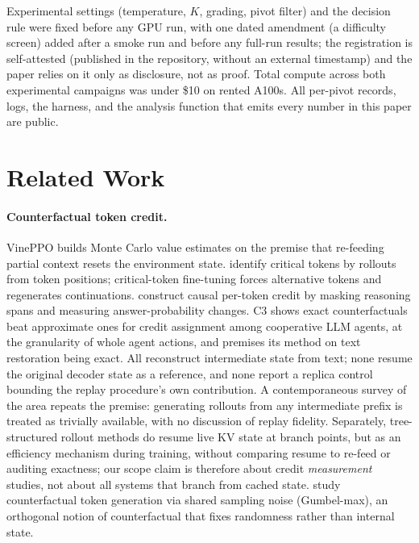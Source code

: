 \documentclass[11pt]{article}
\begin{document}
Experimental settings (temperature, $K$, grading, pivot filter) and the
decision rule were fixed before any GPU run, with one dated amendment
(a difficulty screen) added after a smoke run and before any full-run
results; the registration is self-attested (published in the repository,
without an external timestamp) and the paper relies on it only as
disclosure, not as proof. Total compute across both experimental campaigns
was under \$10 on rented A100s. All per-pivot records, logs, the harness,
and the analysis function that emits every number in this paper are public.

\section{Related Work}

\paragraph{Counterfactual token credit.} VinePPO
\citep{kazemnejad2024vineppo} builds Monte Carlo value estimates on the
premise that re-feeding partial context resets the environment state.
\citet{lin2024critical} identify critical tokens by rollouts from token
positions; critical-token fine-tuning \citep{ruan2025cft} forces
alternative tokens and regenerates continuations. \citet{khandoga2026beyond}
construct causal per-token credit by masking reasoning spans and measuring
answer-probability changes. C3 \citep{chen2026exact} shows exact
counterfactuals beat approximate ones for credit assignment among
cooperative LLM agents, at the granularity of whole agent actions, and
premises its method on text restoration being exact. All reconstruct
intermediate state from text; none resume the original decoder state as a
reference, and none report a replica control bounding the replay procedure's
own contribution. A contemporaneous survey of the area
\citep{zhang2026survey} repeats the premise: generating rollouts from any
intermediate prefix is treated as trivially available, with no discussion
of replay fidelity. Separately, tree-structured rollout methods
\citep{li2025treepo} do resume live KV state at branch points, but as an
efficiency mechanism during training, without comparing resume to re-feed
or auditing exactness; our scope claim is therefore about credit
\emph{measurement} studies, not about all systems that branch from cached
state. \citet{chatzi2024counterfactual} study counterfactual token
generation via shared sampling noise (Gumbel-max), an orthogonal notion of
counterfactual that fixes randomness rather than internal state.
\end{document}
